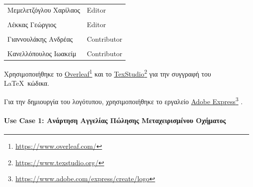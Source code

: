\documentclass{../ol-softwaremanual}
\newcommand{\doclink}[2]{\href{#1}{#2}\footnote{\url{#1}}}
\begin{document}
	
	\vspace{20pt}
	
	\begin{table}[htbp!]
		\begin{tabular}{ll}
			Μεμελετζόγλου Χαρίλαος & \en Editor \\
			\\ Λέκκας Γεώργιος      &   \en  Editor \\
			\\ Γιαννουλάκης Ανδρέας & \en Contributor \\
			\\ Κανελλόπουλος Ιωακείμ & \en Contributor \\ 
		\end{tabular}
	\end{table}
	
	
	\vspace{20pt}
	
	
	\vspace{20pt}
	\flushleft
	Χρησιμοποιήθηκε το \en \doclink{https://www.overleaf.com/}{Overleaf} \gr και το \en \doclink{https://www.texstudio.org/}{TexStudio} \gr για την συγγραφή του \LaTeX\ κώδικα. \break
	
	Για την δημιουργία του λογότυπου, χρησιμοποιήθηκε το εργαλείο \en \doclink{https://www.adobe.com/express/create/logo}{Adobe Express} . \gr \break
	
	\newpage
	
	
	\paragraph{\en Use Case 1: \gr Ανάρτηση Αγγελίας Πώλησης Μεταχειρισμένου Οχήματος}
	
\end{document}
